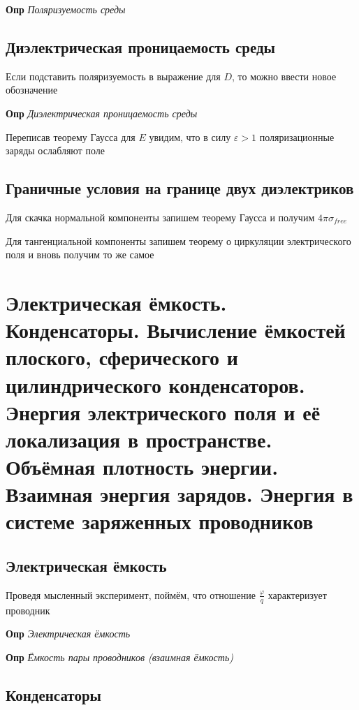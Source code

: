 \documentclass[a4paper, 14pt]{article}
\begin{document}
    \textbf{Опр} \textit{Поляризуемость среды}
    
    \subsection{Диэлектрическая проницаемость среды}
    
    Если подставить поляризуемость в выражение для $D$, то можно ввести новое обозначение
    
    \textbf{Опр} \textit{Диэлектрическая проницаемость среды}
    
    Переписав теорему Гаусса для $E$ увидим, что в силу $\varepsilon > 1$ поляризационные заряды ослабляют поле
    
    \subsection{Граничные условия на границе двух диэлектриков}
    
    Для скачка нормальной компоненты запишем теорему Гаусса и получим $4 \pi \sigma_{free}$
    
    Для тангенциальной компоненты запишем теорему о циркуляции электрического поля и вновь получим то же самое
    
    \section{Электрическая ёмкость.
    Конденсаторы.
    Вычисление ёмкостей плоского, сферического и цилиндрического конденсаторов.
    Энергия электрического поля и её локализация в пространстве.
    Объёмная плотность энергии.
    Взаимная энергия зарядов.
    Энергия в системе заряженных проводников}
    
    \subsection{Электрическая ёмкость}
    
    Проведя мысленный эксперимент, поймём, что отношение $\frac{\varphi}{q}$ характеризует проводник
    
    \textbf{Опр} \textit{Электрическая ёмкость}
    
    \textbf{Опр} \textit{Ёмкость пары проводников (взаимная ёмкость)}
    
    \subsection{Конденсаторы}
    
\end{document}
